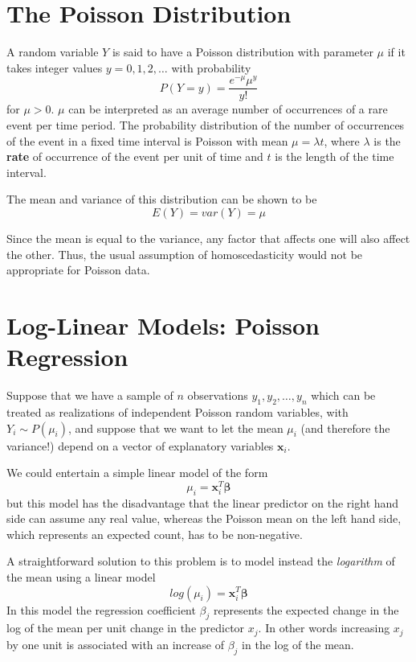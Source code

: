\documentclass{article}
\begin{document}
\section{The Poisson Distribution}
A random variable $Y$ is said to have a Poisson distribution with parameter $\mu$ if it takes integer values $y = 0, 1, 2, \ldots$ with probability
\begin{equation}
    P(Y=y)=\frac{e^{-\mu}\mu^y}{y!}
\end{equation}
for $\mu > 0$. 	$\mu$ can be interpreted as an average number of occurrences of a rare event per time period. The probability distribution of the number of occurrences of the event in a fixed time interval is Poisson with mean $\mu = \lambda t$, where $\lambda$ is the \textbf{rate} of occurrence of the event per unit of time and $t$ is the length of the time interval.

The mean and variance of this distribution can be shown to be
\begin{equation}
    E(Y)=var(Y)=\mu
\end{equation}

Since the mean is equal to the variance, any factor that affects one will also affect the other. Thus, the usual assumption of homoscedasticity would not be appropriate for Poisson data.

\section{Log-Linear Models: Poisson Regression}
Suppose that we have a sample of $n$ observations $y_1,y_2,\ldots,y_n$ which can be treated as realizations of independent Poisson random variables, with $Y_i \sim P(\mu_i)$, and suppose that we want to let the mean $\mu_i$ (and therefore the variance!) depend on a vector of explanatory variables $\mathbf{x}_i$.

We could entertain a simple linear model of the form
\begin{equation}
    \mu_i=\mathbf{x}^T_i\bm{\beta}
\end{equation}
but this model has the disadvantage that the linear predictor on the right hand side can assume any real value, whereas the Poisson mean on the left hand side, which represents an expected count, has to be non-negative.

A straightforward solution to this problem is to model instead the \textit{logarithm} of the mean using a linear model
\begin{equation}
    \label{emu:log}
    log(\mu_i)=\mathbf{x}^T_i\bm{\beta}
\end{equation}
In this model the regression coefficient $\beta_j$ represents the expected change in the log of the mean per unit change in the predictor $x_j$. In other words increasing $x_j$ by one unit is associated with an increase of $\beta_j$ in the log of the mean.
\end{document}
